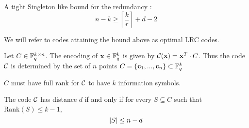 A tight Singleton like bound for the redundancy \cite{GHSY12}:
\begin{equation}
n - k \geq \left\lceil \frac{k}{r} \right\rceil + d - 2
\end{equation}

We will refer to codes attaining the bound above as optimal LRC codes.

Let $C \in {\mathbb F}_q^{k \times n}$. The encoding of $\mathbf{x} \in {\mathbb F}_q^k$ is given by ${\mathcal C}(\mathbf{x}) = \mathbf{x}^T \cdot C$. Thus the code ${\mathcal C}$ is determined by the set of $n$ points $C = \{ \mathbf{c}_1, ... , \mathbf{c}_n \} \subset {\mathbb F}_q^k$

$C$ must have full rank for ${\mathcal C}$ to have $k$ information symbols.

The code ${\mathcal C}$ has distance $d$ if and only if for every $S \subseteq C$ such that $\mbox{Rank}(S) \leq k-1$, 
\begin{equation}
\left\vert {S} \right\vert \leq n-d
\end{equation}
